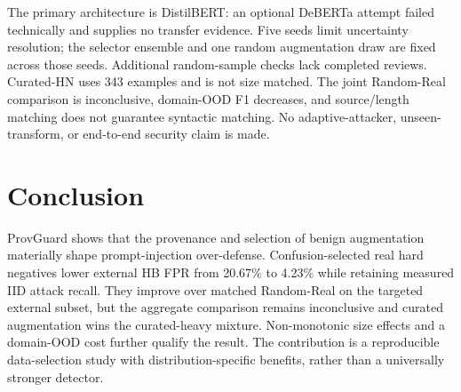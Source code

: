 \documentclass[conference]{IEEEtran}
\newcommand{\BaseExtPct}{20.67}
\newcommand{\PGExtPct}{4.23}
\newcommand{\NCurAug}{343}
\begin{document}
The primary architecture is DistilBERT: an optional DeBERTa attempt failed technically and supplies no transfer evidence. Five seeds limit uncertainty resolution; the selector ensemble and one random augmentation draw are fixed across those seeds. Additional random-sample checks lack completed reviews. Curated-HN uses \NCurAug{} examples and is not size matched. The joint Random-Real comparison is inconclusive, domain-OOD F1 decreases, and source/length matching does not guarantee syntactic matching. No adaptive-attacker, unseen-transform, or end-to-end security claim is made.

\section{Conclusion}
ProvGuard shows that the provenance and selection of benign augmentation materially shape prompt-injection over-defense. Confusion-selected real hard negatives lower external HB FPR from \BaseExtPct\% to \PGExtPct\% while retaining measured IID attack recall. They improve over matched Random-Real on the targeted external subset, but the aggregate comparison remains inconclusive and curated augmentation wins the curated-heavy mixture. Non-monotonic size effects and a domain-OOD cost further qualify the result. The contribution is a reproducible data-selection study with distribution-specific benefits, rather than a universally stronger detector.
\end{document}
